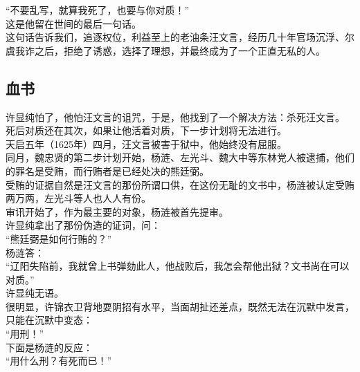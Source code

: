 \begin{multicols}{\theparacolNo}
“不要乱写，就算我死了，也要与你对质！”\\

这是他留在世间的最后一句话。\\

这句话告诉我们，追逐权位，利益至上的老油条汪文言，经历几十年官场沉浮、尔虞我诈之后，拒绝了诱惑，选择了理想，并最终成为了一个正直无私的人。\\

\subsection{血书}
许显纯怕了，他怕汪文言的诅咒，于是，他找到了一个解决方法：杀死汪文言。\\

死后对质还在其次，如果让他活着对质，下一步计划将无法进行。\\

天启五年（1625年）四月，汪文言被害于狱中，他始终没有屈服。\\

同月，魏忠贤的第二步计划开始，杨涟、左光斗、魏大中等东林党人被逮捕，他们的罪名是受贿，而行贿者是已经处决的熊廷弼。\\

受贿的证据自然是汪文言的那份所谓口供，在这份无耻的文书中，杨涟被认定受贿两万两，左光斗等人也人人有份。\\

审讯开始了，作为最主要的对象，杨涟被首先提审。\\

许显纯拿出了那份伪造的证词，问：\\

“熊廷弼是如何行贿的？”\\

杨涟答：\\

“辽阳失陷前，我就曾上书弹劾此人，他战败后，我怎会帮他出狱？文书尚在可以对质。”\\

许显纯无语。\\

很明显，许锦衣卫背地耍阴招有水平，当面胡扯还差点，既然无法在沉默中发言，只能在沉默中变态：\\

“用刑！”\\

下面是杨涟的反应：\\

“用什么刑？有死而已！”\\


\end{multicols}

